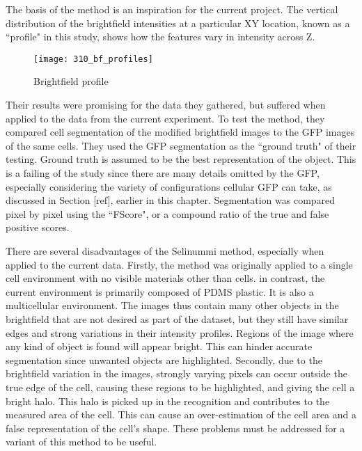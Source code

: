 The basis of the method is an inspiration for the current project. The vertical distribution of the brightfield intensities at a particular XY location, known as a ``profile" in this study, shows how the features vary in intensity across Z.

\begin{figure}[p]
 \centering
 \texttt{[image: 310\_bf\_profiles]}
 \caption{
 	Brightfield profile
 }
 \label{fig:brightfieldprofile}
\end{figure}

Their results were promising for the data they gathered, but suffered when applied to the data from the current experiment. To test the method, they compared cell segmentation of the modified brightfield images to the GFP images of the same cells. They used the GFP segmentation as the ``ground truth" of their testing. Ground truth is assumed to be the best representation of the object. This is a failing of the study since there are many details omitted by the GFP, especially considering the variety of configurations cellular GFP can take, as discussed in Section [ref], earlier in this chapter. Segmentation was compared pixel by pixel using the ``FScore", or a compound ratio of the true and false positive scores.

There are several disadvantages of the Selinummi method, especially when applied to the current data. Firstly, the method was originally applied to a single cell environment with no visible materials other than cells. in contrast, the current environment is primarily composed of PDMS plastic. It is also a multicellular environment. The images thus contain many other objects in the brightfield that are not desired as part of the dataset, but they still have similar edges and strong variations in their intensity profiles. Regions of the image where any kind of object is found will appear bright. This can hinder accurate segmentation since unwanted objects are highlighted. Secondly, due to the brightfield variation in the images, strongly varying pixels can occur outside the true edge of the cell, causing these regions to be highlighted, and giving the cell a bright halo. This halo is picked up in the recognition and contributes to the measured area of the cell. This can cause an over-estimation of the cell area and a false representation of the cell's shape. These problems must be addressed for a variant of this method to be useful.
